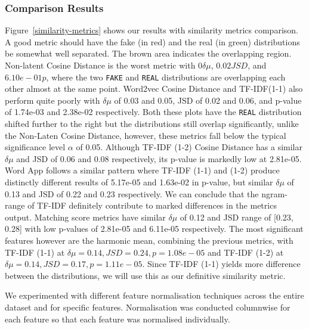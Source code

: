 \documentclass{article}
\begin{document}
\subsubsection{Comparison Results}
Figure~\ref{similarity-metrics} shows our results with similarity metrics comparison. A good metric should have the fake (in red) and the real (in green) distributions be somewhat well separated. The brown area indicates the overlapping region. Non-latent Cosine Distance is the worst metric with $0 \delta \mu$, $0.02 JSD$, and $6.10e-01 p$, where the two \texttt{FAKE} and \texttt{REAL} distributions are overlapping each other almost at the same point. Word2vec Cosine Distance and TF-IDF(1-1) also perform quite poorly with $\delta \mu$ of 0.03 and 0.05, JSD of 0.02 and 0.06, and p-value of 1.74e-03 and 2.38e-02 respectively. Both these plots have the \texttt{REAL} distribution shifted further to the right but the distributions still overlap significantly, unlike the Non-Laten Cosine Distance, however, these metrics fall below the typical significance level $\alpha$ of 0.05. Although TF-IDF (1-2) Cosine Distance has a similar $\delta \mu$ and JSD of 0.06 and 0.08 respectively, its p-value is markedly low at 2.81e-05. Word App follows a similar pattern where TF-IDF (1-1) and (1-2) produce distinctly different results of 5.17e-05 and 1.63e-02 in p-value, but similar $\delta \mu$ of 0.13 and JSD of 0.22 and 0.23 respectively. We can conclude that the ngram-range of TF-IDF definitely contribute to marked differences in the metrics output. Matching score metrics have similar $\delta \mu$ of 0.12 and JSD range of [0.23, 0.28] with low p-values of 2.81e-05 and 6.11e-05 respectively. The most significant features however are the harmonic mean, combining the previous metrics, with TF-IDF (1-1) at $\delta \mu = 0.14, JSD = 0.24, p = 1.08e-05$ and TF-IDF (1-2) at $\delta \mu = 0.14, JSD = 0.17, p = 1.11e-05$. Since TF-IDF (1-1) yields more difference between the distributions, we will use this as our definitive similarity metric.




We experimented with different feature normalisation techniques across the entire dataset and for specific features. Normalisation was conducted columnwise for each feature so that each feature was normalised individually.
\end{document}
